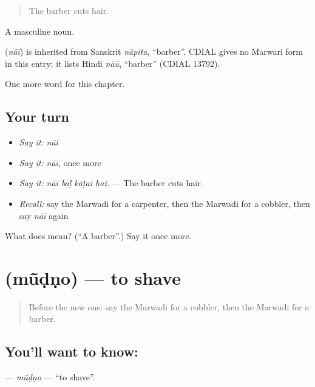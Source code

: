 \begin{quote}
The barber cuts hair.
\end{quote}

A masculine noun.

\begin{cousinweb}
\textbf{} (\emph{nāī}) is inherited from Sanskrit \emph{nāpita}, \textquotedblleft{}barber\textquotedblright{}. CDIAL gives no Marwari form in this entry; it lists Hindi \emph{nāū}, \textquotedblleft{}barber\textquotedblright{} (CDIAL 13792).
\end{cousinweb}

\begin{grammarlens}[title={What you've built}]
One more word for this chapter.
\end{grammarlens}

\subsection*{Your turn}
\begin{itemize}
\raggedright
  \item \emph{Say it:} \emph{nāī}
  \item \emph{Say it:} \emph{nāī}, once more
  \item \emph{Say it:} \emph{nāī bāḷ kāṭai hai.} — The barber cuts hair.
  \item \emph{Recall:} say the Marwadi for a carpenter, then the Marwadi for a cobbler, then say \emph{nāī} again
\end{itemize}

\begin{tcolorbox}[breakable,colback=teal!4,colframe=teal!35!black,title={Before you move on}]
What does  mean? (\textquotedblleft{}A barber\textquotedblright{}.) Say it once more.
\end{tcolorbox}
\section[\texorpdfstring{\mw{मूंडणो} (mū̃ḍṇo)}{मूंडणो (mū̃ḍṇo)}]{ (mū̃ḍṇo) — to shave}

\label{lesson:MW-C265-mudno}



\begin{quote}
Before the new one: say the Marwadi for a cobbler, then the Marwadi for a barber.
\end{quote}

\subsection*{You'll want to know: }
\textbf{} — \emph{mū̃ḍṇo} — \textquotedblleft{}to shave\textquotedblright{}.

